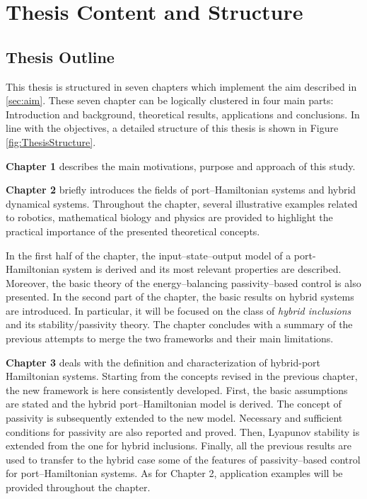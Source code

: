 %
\clearpage

\section{Thesis Content and Structure}
\subsection{Thesis Outline}
This thesis is structured in seven chapters which implement the aim described in \ref{sec:aim}. 
These seven chapter can be logically clustered in four main parts: Introduction and background, theoretical results, applications and conclusions. In line with the objectives, a detailed structure of this thesis is shown in Figure \ref{fig:ThesisStructure}.
%
\newline

%
\textbf{Chapter 1} describes the main motivations, purpose and approach of this study.
%
\newline

%
\textbf{Chapter 2} briefly introduces the fields of port--Hamiltonian systems and hybrid dynamical systems. Throughout the chapter, several illustrative examples related to robotics, mathematical biology and physics are provided to highlight the practical importance of the presented theoretical concepts. 

In the first half of the chapter, the input--state--output model of a port-Hamiltonian system is derived and its most relevant properties are described. Moreover, the basic theory of the energy--balancing passivity--based control is also presented. In the second part of the chapter, the basic results on hybrid systems are introduced. In particular, it will be focused on the class of \textit{hybrid inclusions} and its stability/passivity theory.  The chapter concludes with a summary of the previous attempts to merge the two frameworks and their main limitations. 
%
\newline

%
\textbf{Chapter 3} deals with the definition and characterization of hybrid-port Hamiltonian systems. Starting from the concepts revised in the previous chapter, the new framework is here consistently developed. First, the basic assumptions are stated and the hybrid port--Hamiltonian model is derived. The concept of passivity is subsequently extended to the new model. Necessary and sufficient conditions for passivity are also reported and proved. Then, Lyapunov stability is extended from the one for hybrid inclusions. Finally, all the previous results are used to transfer to the hybrid case some of the features of passivity--based control for port--Hamiltonian systems. As for Chapter 2, application examples will be provided throughout the chapter.
%
\newline

